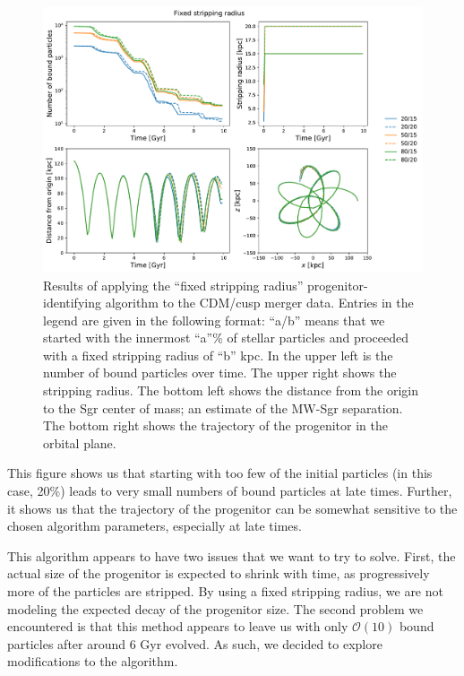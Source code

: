 \begin{figure}
    \centering
    \includegraphics[width=0.9\linewidth]{figs/fixed_star.pdf}
    \caption{%
        Results of applying the ``fixed stripping radius''
        progenitor-identifying algorithm to the CDM/cusp merger data. Entries in
        the legend are given in the following format: ``a/b'' means that we
        started with the innermost ``a''\% of stellar particles and proceeded
        with a fixed stripping radius of ``b'' kpc.  In the upper left is the
        number of bound particles over time.  The upper right shows the
        stripping radius.  The bottom left shows the distance from the origin
        to the Sgr center of mass; an estimate of the MW-Sgr separation.  The
        bottom right shows the trajectory of the progenitor in the orbital
        plane.
    }
    \label{fig:fixed_star}
\end{figure}

This figure shows us that starting with too few of the initial particles (in
this case, 20\%) leads to very small numbers of bound particles at late times.
Further, it shows us that the trajectory of the progenitor can be somewhat
sensitive to the chosen algorithm parameters, especially at late times.

This algorithm appears to have two issues that we want to try to solve.
First, the actual size of the progenitor is expected to shrink with time, as
progressively more of the particles are stripped.  By using a fixed stripping
radius, we are not modeling the expected decay of the progenitor size.  The
second problem we encountered is that this method appears to leave us with
only $\mathcal{O}(10)$ bound particles after around 6 Gyr evolved.  As such,
we decided to explore modifications to the algorithm.

